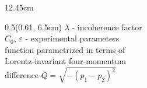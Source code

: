 \documentclass[xcolor=dvipsnames]{beamer}
\begin{document}
\begin{frame}
\begin{textblock*}{12.45cm}
\end{textblock*}

\begin{textblock*}{0.5\linewidth}(0.61\linewidth, 6.5cm)
\small{
\textcolor{dgreen}{$\lambda$} - \hspace{0.02cm} incoherence factor\\\vspace{0.2cm}
$C_0$, $\varepsilon$ - experimental parameters\\
\vspace{0.3cm}
function parametrized in terms of \\
Lorentz-invariant four-momentum \\
difference $Q=\sqrt{-(p_1-p_2)^2}$\
}
\end{textblock*}
\end{frame}
\end{document}
